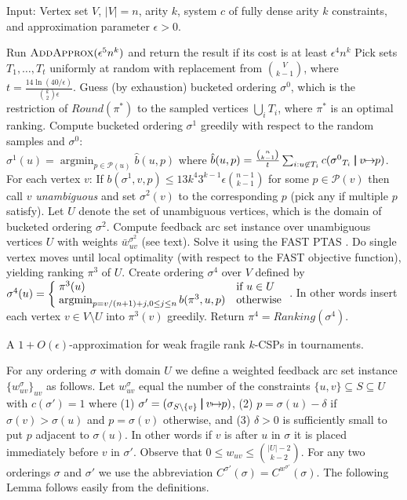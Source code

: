 \documentclass[dvips,11pt,letter]{article}
\makeatletter
\newcommand{\piecewise}[1]{\left\{\begin{array}{@{\;}ll}#1\end{array}\right.}
\newcommand{\set}[1]{\{#1\}}                        \newcommand{\setof}[2]{\{\,{#1}\::\:{#2}\,\}}        \newcommand{\groupFrac}[2]{\left(\frac{#1}{#2}\right)}
\newcommand{\sm}{\setminus} \newcommand{\compl}[1]{\overline{#1}}                \newcommand{\floor}[1]{\left\lfloor #1 \right\rfloor}
\DeclareMathOperator{\argmin}{argmin}
\newcommand{\unaryOrdering}{\!\!\mapsto\!\!}
\newcommand{\addApprox}{\textsc{AddApprox}}
\newcommand{\fast}{\textsc{FAST}}
\newcommand{\posns}{\mathcal{P}}
\newcommand{\bp}{\,\,\rule[-0.22em]{0.08em}{1em}\,\,} \newcommand{\restrictO}[2]{{#1}_{#2}}
\makeatother
\begin{document}
\begin{algorithm}[btp]
Input: Vertex set $V$, $|V|=n$, arity $k$, system $c$ of fully dense arity $k$ constraints, and approximation parameter $\epsilon>0$.
\begin{algorithmic}[1]
\STATE Run $\addApprox(\epsilon^5 n^k)$ and return the result if its cost is at least $\epsilon^4 n^k$
\STATE Pick sets $T_1,\ldots,T_t$ uniformly at random with replacement from $\binom{V}{k-1}$, where $t=\frac{14 \ln (40/\epsilon)}{\binom{k}{2} \epsilon}$.  Guess (by exhaustion) bucketed ordering $\sigma^0$, which is the restriction of $Round(\pi^*)$ to the sampled vertices $\bigcup_i T_i$, where $\pi^*$ is an optimal ranking.
\STATE Compute bucketed ordering $\sigma^1$ greedily with respect to the random samples and $\sigma^0$: \\
$\sigma^1(u) = \argmin_{p \in \posns(u)} \hat b(u, p)$ where $\hat b(u,p) = \frac{\binom{n}{k-1}}{t} \sum_{i : u \not\in T_i} c(\restrictO{\sigma^0}{T_i} \bp v \unaryOrdering p)$.
\STATE For each vertex $v$: If $b(\sigma^1, v, p) \le 13 k^4 3^{k-1} \epsilon \binom{n-1}{k-1}$ for some $p \in \posns(v)$ then call $v$ \emph{unambiguous} and set $\sigma^2(v)$ to the corresponding $p$ (pick any if multiple $p$ satisfy). Let $U$ denote the set of unambiguous vertices, which is the domain of bucketed ordering $\sigma^2$.
\STATE Compute feedback arc set instance over unambiguous vertices $U$ with weights $\bar w_{uv}^{\sigma^2}$ (see text). Solve it using the \fast{} PTAS \cite{mathieu09fast}. Do single vertex moves until local optimality (with respect to the \fast{} objective function), yielding ranking $\pi^3$ of $U$.
\STATE Create ordering $\sigma^4$ over $V$ defined by $\sigma^4(u) = \piecewise{\pi^3(u) & \text{if }u \in U \\ \argmin_{p=v/(n+1) + j, 0 \le j \le n} b(\pi^3, u, p) & \text{otherwise}}$. In other words insert each vertex $v \in V \sm U$ into $\pi^3(v)$ greedily. 
\STATE Return $\pi^4 = Ranking(\sigma^4)$.
\end{algorithmic}
\caption{A $1+O(\epsilon)$-approximation for weak fragile rank $k$-CSPs in tournaments.\label{alg:main}}
\end{algorithm}


For any ordering $\sigma$ with domain $U$ we define a weighted feedback arc set instance $\set{w_{uv}^{\sigma}}_{uv}$ as follows. Let $w_{uv}^{\sigma}$ equal the number of the constraints $\set{u,v} \subseteq S \subseteq U$ with $c(\sigma')=1$ where (1) $\sigma' = (\restrictO{\sigma}{S \sm \set{v}} \bp v \unaryOrdering p)$, (2) $p = \sigma(u)-\delta$ if $\sigma(v) > \sigma(u)$ and $p = \sigma(v)$ otherwise, and (3) $\delta>0$ is sufficiently small to put $p$ adjacent to $\sigma(u)$. In other words if $v$ is after $u$ in $\sigma$ it is placed immediately before $v$ in $\sigma'$. Observe that $0 \le w_{uv} \le \binom{|U|-2}{k-2}$. For any two orderings $\sigma$ and $\sigma'$ we use the abbreviation $C^{\sigma'}(\sigma) = C^{w^{\sigma'}}(\sigma)$.
The following Lemma follows easily from the definitions.
\end{document}
